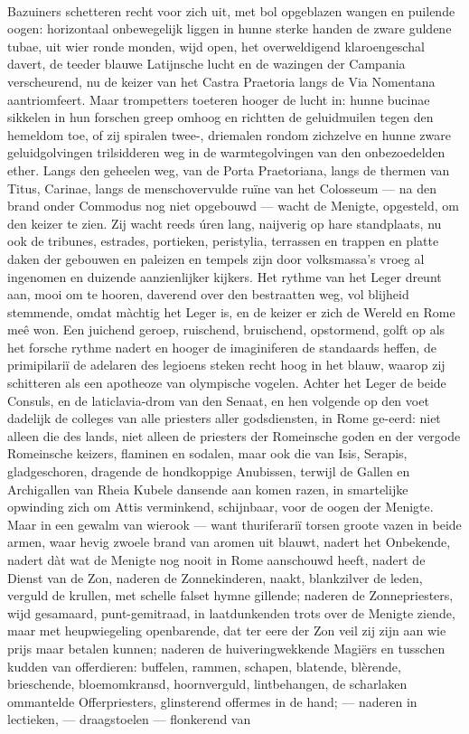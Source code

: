 \documentclass[a4paper, 12pt, oneside, dutch]{article}
\begin{document}
\paragraph{}
Bazuiners schetteren recht voor zich uit, met bol opgeblazen wangen en puilende oogen: horizontaal onbewegelijk liggen in hunne sterke handen de zware guldene tubae, uit wier ronde monden, wijd open, het overweldigend klaroengeschal davert, de teeder blauwe Latijnsche lucht en de wazingen der Campania verscheurend, nu de keizer van het Castra Praetoria langs de Via Nomentana aantriomfeert. Maar trompetters toeteren hooger de lucht in: hunne bucinae sikkelen in hun forschen greep omhoog en richtten de geluidmuilen tegen den hemeldom toe, of zij spiralen twee-, driemalen rondom zichzelve en hunne zware geluidgolvingen trilsidderen weg in de warmtegolvingen van den onbezoedelden ether. Langs den geheelen weg, van de Porta Praetoriana, langs de thermen van Titus, Carinae, langs de menschovervulde ruïne van het Colosseum --- na den brand onder Commodus nog niet opgebouwd --- wacht de Menigte, opgesteld, om den keizer te zien. Zij wacht reeds úren lang, naijverig op hare standplaats, nu ook de tribunes, estrades, portieken, peristylia, terrassen en trappen en platte daken der gebouwen en paleizen en tempels zijn door volksmassa's vroeg al ingenomen en duizende aanzienlijker kijkers. Het rythme van het Leger dreunt aan, mooi om te hooren, daverend over den bestraatten weg, vol blijheid stemmende, omdat màchtig het Leger is, en de keizer er zich de Wereld en Rome meê won. Een juichend geroep, ruischend, bruischend, opstormend, golft op als het forsche rythme nadert en hooger de imaginiferen de standaards heffen, de primipilariï de adelaren des legioens steken recht hoog in het blauw, waarop zij schitteren als een apotheoze van olympische vogelen. Achter het Leger de beide Consuls, en de laticlavia-drom van den Senaat, en hen volgende op den voet dadelijk de colleges van alle priesters aller godsdiensten, in Rome ge-eerd: niet alleen die des lands, niet alleen de priesters der Romeinsche goden en der vergode Romeinsche keizers, flaminen en sodalen, maar ook die van Isis, Serapis, gladgeschoren, dragende de hondkoppige Anubissen, terwijl de Gallen en Archigallen van Rheia Kubele dansende aan komen razen, in smartelijke opwinding zich om Attis verminkend, schijnbaar, voor de oogen der Menigte. Maar in een gewalm van wierook --- want thuriferariï torsen groote vazen in beide armen, waar hevig zwoele brand van aromen uit blauwt, nadert het Onbekende, nadert dàt wat de Menigte nog nooit in Rome aanschouwd heeft, nadert de Dienst van de Zon, naderen de Zonnekinderen, naakt, blankzilver de leden, verguld de krullen, met schelle falset hymne gillende; naderen de Zonnepriesters, wijd gesamaard, punt-gemitraad, in laatdunkenden trots over de Menigte ziende, maar met heupwiegeling openbarende, dat ter eere der Zon veil zij zijn aan wie prijs maar betalen kunnen; naderen de huiveringwekkende Magiërs en tusschen kudden van offerdieren: buffelen, rammen, schapen, blatende, blèrende, brieschende, bloemomkransd, hoornverguld, lintbehangen, de scharlaken ommantelde Offerpriesters, glinsterend offermes in de hand; --- naderen in lectieken, --- draagstoelen --- flonkerend van 
\end{document}
